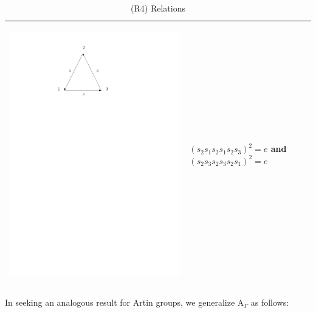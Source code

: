 \documentclass[11pt]{amsart}
\theoremstyle{definition}
\begin{document}
\begin{table}
\begin{tabular}{| p{3.5cm} | p{7cm} |}
\begin{center}\includegraphics[scale = .30]{Diagram5.pdf}\end{center} & $(s_{2}s_{1}s_{2}s_{1}s_{2}s_{3})^{2} = e$ and $(s_{2}s_{3}s_{2}s_{3}s_{2}s_{1})^{2} = e$ \\ \hline
\end{tabular}
\caption{(R4) Relations}
\end{table}

In seeking an analogous result for Artin groups, we generalize A$_{\Gamma}$ as follows:
\end{document}
